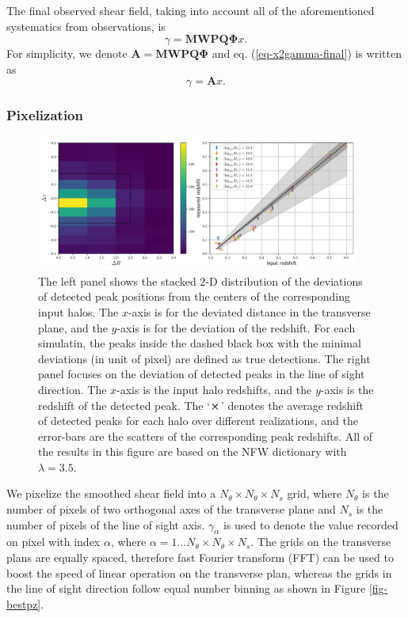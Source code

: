 \documentclass[twocolumn]{aastex62}
\begin{document}
The final observed shear field, taking into account all of the aforementioned systematics from observations,
is
\begin{equation}\label{eq-x2gamma-final}
\gamma =\mathbf{M} \mathbf{W} \mathbf{P} \mathbf{Q} \mathbf{\Phi} x.
\end{equation}
For simplicity, we denote $\mathbf{A}=\mathbf{M} \mathbf{W} \mathbf{P} \mathbf{Q} \mathbf{\Phi} $ and
eq. (\ref{eq-x2gamma-final}) is written as
\begin{equation}\label{eq-x2gamma-simple}
\gamma=\mathbf{A} x.
\end{equation}


\subsubsection{Pixelization}
\label{subsec:method-pixel}

\begin{figure}[!t]
 \centering
 \includegraphics[width=0.95\textwidth]{peak_scatters_f3-1.pdf}
 \caption{The left panel shows the stacked $2$-D distribution of the deviations of detected peak positions
 from the centers of the corresponding input halos. The $x$-axis is for the deviated distance in the transverse plane, and 
 the $y$-axis is for the deviation of the redshift. For each simulatin, the peaks inside the dashed black box with the
 minimal deviations (in unit of pixel) are defined as true detections. 
 The right panel focuses on the deviation of detected peaks in the line of sight direction. The $x$-axis is the input 
 halo redshifts, and the $y$-axis is the redshift of the detected peak. The `$\cross$' denotes the average redshift of 
 detected peaks for each halo over different realizations, and the error-bars are the scatters of the corresponding peak 
 redshifts. All of the results in this figure are based on the NFW dictionary with $\lambda=3.5$.}
\end{figure}

We pixelize the smoothed shear field into a $N_\theta \times N_\theta \times N_s$ grid, where $N_\theta$
is the number of pixels of two orthogonal axes of the transverse plane and $N_s$ is the number of pixels of the
line of sight axis. $\gamma_{\alpha}$ is used to denote the value recorded on pixel with index $\alpha$, where $\alpha=
1...N_\theta \times N_\theta \times N_s$. The grids on the transverse plans are equally spaced, therefore fast Fourier
transform (FFT) can be used to boost the speed of linear operation on the transverse plan, whereas the grids in the
line of sight direction follow equal number binning as shown in Figure \ref{fig-bestpz}.
\end{document}
